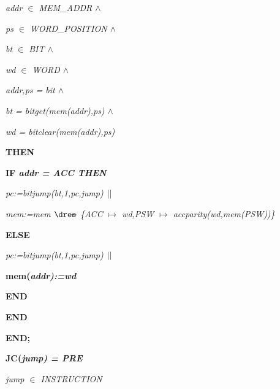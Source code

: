 \begin{sloppypar}
\hspace*{0.30in}\it addr $\in$  \it MEM\_ADDR  $\land$ 

\hspace*{0.30in}\it ps $\in$  \it WORD\_POSITION  $\land$ 

\hspace*{0.30in}\it bt $\in$  \it BIT  $\land$ 

\hspace*{0.30in}\it wd $\in$  \it WORD  $\land$ 

\hspace*{0.30in}\it addr\rm ,\it ps \rm = \it bit  $\land$ 

\hspace*{0.30in}\it bt \rm = \it bitget\rm (\it mem\rm (\it addr\rm )\rm ,\it ps\rm )  $\land$ 

\hspace*{0.30in}\it wd \rm = \it bitclear\rm (\it mem\rm (\it addr\rm )\rm ,\it ps\rm )

\hspace*{0.20in}\bf THEN

\hspace*{0.30in}\bf IF \it addr \rm = \it ACC \bf THEN

\hspace*{0.40in}\it pc\rm :=\it bitjump\rm (\it bt\rm ,\rm 1\rm ,\it pc\rm ,\it jump\rm )  $\mbox{$\mid\mid$}$ 

\hspace*{0.40in}\it mem\rm :=\it mem $\lover$ \rm \{\it ACC $\mapsto$ \it wd\rm ,\it PSW $\mapsto$ \it accparity\rm (\it wd\rm ,\it mem\rm (\it PSW\rm )\rm )\rm \}

\hspace*{0.30in}\bf ELSE

\hspace*{0.40in}\it pc\rm :=\it bitjump\rm (\it bt\rm ,\rm 1\rm ,\it pc\rm ,\it jump\rm )  $\mbox{$\mid\mid$}$ 

\hspace*{0.40in}\bf mem\rm (\it addr\rm )\rm :=\it wd

\hspace*{0.30in}\bf END

\hspace*{0.20in}\bf END

\hspace*{0.10in}\bf END\rm ;

\hspace*{0.10in}\bf JC\rm (\it jump\rm ) \rm = \bf PRE

\hspace*{0.20in}\it jump $\in$  \it INSTRUCTION


\end{sloppypar}
